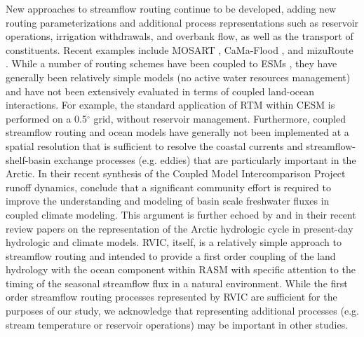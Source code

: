 \documentclass[jgrga, draft]{agutex}
\begin{document}
\begin{article}
New approaches to streamflow routing continue to be developed, adding new routing parameterizations and additional process representations such as reservoir operations, irrigation withdrawals, and overbank flow, as well as the transport of constituents.
Recent examples include MOSART \citep{Li_2013}, CaMa-Flood \citep{Yamazaki_2009,Yamazaki_2014}, and mizuRoute \citep{Clark_2016}.
While a number of routing schemes have been coupled to ESMs \citep[e.g.][]{Olivera_2000,Sushama_2004}, they have generally been relatively simple models (no active water resources management) and have not been extensively evaluated in terms of coupled land-ocean interactions.
For example, the standard application of RTM within CESM is performed on a 0.5$^{\circ}$ grid, without reservoir management.
Furthermore, coupled streamflow routing and ocean models have generally not been implemented at a spatial resolution that is sufficient to resolve the coastal currents and streamflow-shelf-basin exchange processes (e.g. eddies) that are particularly important in the Arctic.
In their recent synthesis of the Coupled Model Intercomparison Project \citep[CMIP5; ][]{Taylor_2012} runoff dynamics, \citet{Bring_2015} conclude that a significant community effort is required to improve the understanding and modeling of basin scale freshwater fluxes in coupled climate modeling.
This argument is further echoed by \citet{Lique_2015} and \citet{Bring_2016} in their recent review papers on the representation of the Arctic hydrologic cycle in present-day hydrologic and climate models.
RVIC, itself, is a relatively simple approach to streamflow routing and intended to provide a first order coupling of the land hydrology with the ocean component within RASM with specific attention to the timing of the seasonal streamflow flux in a natural environment.
While the first order streamflow routing processes represented by RVIC are sufficient for the purposes of our study, we acknowledge that representing additional processes (e.g. stream temperature or reservoir operations) may be important in other studies.


\end{article}
\end{document}
